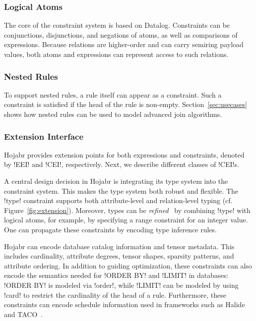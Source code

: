 \documentclass[sigconf,nonacm]{acmart}
\begin{document}
\subsubsection{Logical Atoms} 
The core of the constraint system is based on Datalog. Constraints can be conjunctions, disjunctions, and negations of atoms, as well as comparisons of expressions. Because relations are higher-order and can carry semiring payload values, both atoms and expressions can represent access to such relations.

\subsubsection{Nested Rules} To support nested rules, a rule itself can appear as a constraint. Such a constraint is satisfied if the head of the rule is non-empty. Section~\ref{sec:usecases} shows how nested rules can be used to model advanced join algorithms.

\subsubsection{Extension Interface}
Hojabr provides extension points for both expressions and constraints, denoted by !EEI! and !CEI!, respectively. Next, we describe different classes of !CEI!s.

 A central design decision in Hojabr is integrating its type system into the constraint system. This makes the type system both robust and flexible. The !type! constraint supports both attribute-level and relation-level typing (cf. Figure~\ref{fig:extension}). Moreover, types can be \textit{refined}~\cite{freeman1991refinement} by combining !type! with logical atoms, for example, by specifying a range constraint for an integer value. One can propagate these constraints by encoding type inference rules.

 Hojabr can encode database catalog information and tensor metadata. This includes cardinality, attribute degrees, tensor shapes, sparsity patterns, and attribute ordering. In addition to guiding optimization, these constraints can also encode the semantics needed for !ORDER BY! and !LIMIT! in databases: !ORDER BY! is modeled via !order!, while !LIMIT! can be modeled by using !card! to restrict the cardinality of the head of a rule. Furthermore, these constraints can encode schedule information used in frameworks such as Halide~\cite{ragan2013halide} and TACO~\cite{kjolstad2017tensor}.
\end{document}

